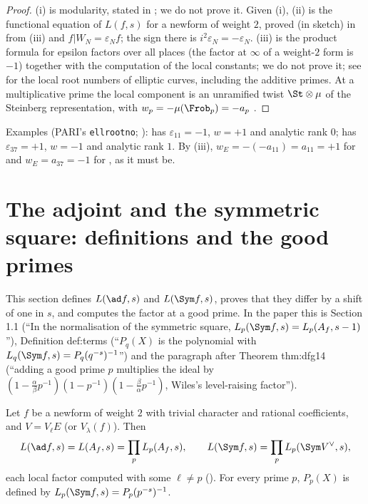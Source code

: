 \begin{proof}
(i) is modularity, stated in  \cite{Wiles95,TaylorWiles,BCDT}; we do not prove it. Given (i), (ii) is the functional equation of $L(f,s)$ for a newform
of weight $2$, proved (in sketch) in  from (iii) and $f|W_N=\varepsilon_Nf$; the sign there is $i^2\varepsilon_N=-\varepsilon_N$. (iii) is the
product formula for epsilon factors over all places (the factor at $\infty$ of a weight-$2$ form is $-1$) together with the computation of the local constants;
we do not prove it; see \cite{Rohrlich94} for the local root numbers of elliptic curves, including the additive primes. At a multiplicative prime the local
component is an unramified twist $\St\otimes\mu$ of the Steinberg representation, with $w_p=-\mu(\Frob_p)=-a_p$ \cite{Rohrlich94}.
\end{proof}

Examples (PARI's \texttt{ellrootno}; ):  has $\varepsilon_{11}=-1$, $w=+1$ and analytic rank $0$;  has $\varepsilon_{37}=+1$, $w=-1$ and analytic
rank $1$. By (iii), $w_E=-(-a_{11})=a_{11}=+1$ for  and $w_E=a_{37}=-1$ for , as it must be.

\section[The adjoint and the symmetric square]{The adjoint and the symmetric square: definitions and the good primes}\label{sec:lfunctions:adjoint}

This section defines $L(\ad f,s)$ and $L(\Sym f,s)$, proves that they differ by a shift of one in $s$, and computes the factor at a good prime. In the paper this
is Section 1.1 (``In the normalisation of the symmetric square, $L_p(\Sym f,s)=L_p(A_f,s-1)$''), Definition def:terms (``$P_q(X)$ is the polynomial with
$L_q(\Sym f,s)=P_q(q^{-s})^{-1}$'') and the paragraph after Theorem thm:dfg14 (``adding a good prime $p$ multiplies the ideal by
$(1-\frac\alpha\beta p^{-1})(1-p^{-1})(1-\frac\beta\alpha p^{-1})$, Wiles's level-raising factor'').

\begin{definition}\label{def:lfunctions:ad-sym}
Let $f$ be a newform of weight $2$ with trivial character and rational coefficients, and $V=V_\ell E$ (or $V_\lambda(f)$). Then
\[
L(\ad f,s)=L(A_f,s)=\prod_pL_p(A_f,s),\qquad L(\Sym f,s)=\prod_pL_p(\Sym V^\vee,s),
\]
each local factor computed with some $\ell\ne p$ (). For every prime $p$, $P_p(X)$ is defined by $L_p(\Sym f,s)=P_p(p^{-s})^{-1}$.
\end{definition}

